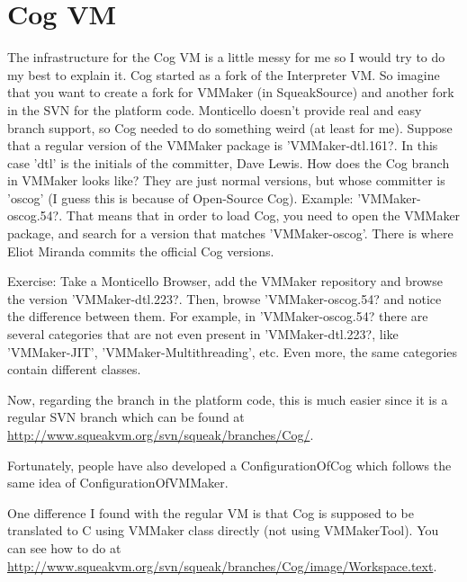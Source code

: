 \documentclass[a4paper,10pt,twoside]{book}
\begin{document}
\section{Cog VM}
The infrastructure for the Cog  VM is a little messy for me so I would try to do my best to explain it. Cog started as a fork of the Interpreter VM. So imagine that you want to create a fork for VMMaker (in SqueakSource) and another fork in the SVN for the platform code. Monticello doesn't provide real and easy branch support, so Cog needed to do something weird (at least for me). Suppose that a regular version of the VMMaker package is 'VMMaker-dtl.161?. In this case 'dtl' is the initials of the committer, Dave Lewis. How does the Cog branch in VMMaker looks like?  They are just normal versions, but whose committer is 'oscog' (I guess this is because of Open-Source Cog). Example: 'VMMaker-oscog.54?. That means that in order to load Cog, you need to open the VMMaker package, and search for a version that matches 'VMMaker-oscog'. There is where Eliot Miranda commits the official Cog versions.

Exercise: Take a Monticello Browser, add the VMMaker repository and browse the version 'VMMaker-dtl.223?. Then, browse 'VMMaker-oscog.54? and notice the difference between them. For example, in 'VMMaker-oscog.54? there are several categories that are not even present in 'VMMaker-dtl.223?, like 'VMMaker-JIT', 'VMMaker-Multithreading', etc. Even more, the same categories contain different classes.

Now, regarding the branch in the platform code, this is much easier since it is a regular SVN branch which can be found at \url{http://www.squeakvm.org/svn/squeak/branches/Cog/}.

Fortunately, people have also developed a ConfigurationOfCog which follows the same idea of ConfigurationOfVMMaker.

One difference I found with the regular VM is that Cog is supposed to be translated to C using VMMaker class directly (not using VMMakerTool). You can see how to do at \url{http://www.squeakvm.org/svn/squeak/branches/Cog/image/Workspace.text}.
\end{document}
